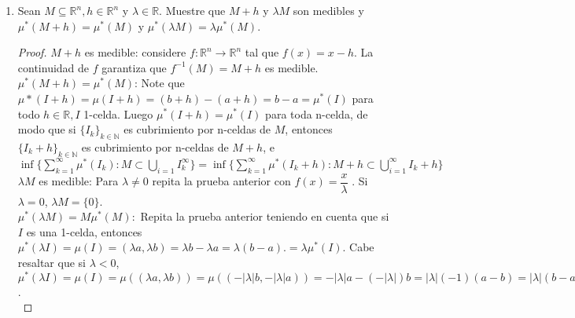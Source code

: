 \documentclass[spanish,12pt,a4paper,openany]{book}
\begin{document}
\begin{enumerate}
\begin{proof}
\begin{itemize}
					\item $\mu^{*}(\mathbb{R}-E_{k}) = 0$ para cada $k$ entonces $\mu^{*}(\mathbb{R}^{n} - \bigcup_{k \in \mathbb{N}} E_{k}) = \mu^{*}(\bigcap_{k \in \mathbb{N}} \mathbb{R}^{n} - E_{k}) \leq \mu^{*}(\mathbb{R}^{n} - E_{k}) = 0$ para cualquier $k$.				
				\end{itemize}   
				En ambos casos la unión es un elemento de $M$. Si tenemos una familia arbitraria de subconjuntos de $M$ podemos separarla en dos uniones y proceder con cada una. 
			\end{proof}
			
			\item Sean $ M \subseteq \mathbb{R}^{n}, h \in \mathbb{R} ^{n}$ y $\lambda \in \mathbb{R}$. Muestre que $M + h $ y $ \lambda M$ son medibles y $\mu^{*}(M+h) = \mu^{*}(M)$ y $\mu^{*}(\lambda M) = \lambda \mu^{*}(M)$. 
			
				\begin{proof}
					$M + h$ es medible: considere $f: \mathbb{R}^{n} \rightarrow \mathbb{R}^{n}$ tal que $f(x) = x - h$. La continuidad de $f$ garantiza que $f ^{-1} (M) = M + h$ es medible.\\
					
					$\mu^{*} (M + h) = \mu^{*} (M)$: Note que $\mu*(I + h) = \mu(I + h) = (b + h) - (a + h)  = b - a = \mu^{*}(I)$ para todo $h \in  \mathbb{R}, I $ 1-celda. Luego $\mu^{*}(I+h)  = \mu^{*}(I)$ para toda n-celda, de modo que si $\{ I_{k}\}_{k \in \mathbb{N}}$ es cubrimiento por n-celdas de $M$, entonces $\{I_{k} + h\}_{k \in \mathbb{N}}$ es cubrimiento por n-celdas de $M + h$, e $\inf \{ \sum_{k=1}^{\infty} \mu^{*} (I_{k}) : M \subset \bigcup_{i=1} I_{k}^{\infty}\} = \inf \{ \sum_{k=1}^{\infty} \mu^{*} (I_{k} + h) : M + h\subset \bigcup_{i=1}^{\infty} I_{k} + h \}$\\
					
					$\lambda M$ es medible: Para $\lambda \neq 0$ repita la prueba anterior con $f(x) = \dfrac{x}{\lambda}$ . Si $\lambda = 0$, $\lambda M = \{ 0 \}$.\\
					
					$\mu^{*}(\lambda M) = M \mu^{*} (M):$ Repita la prueba anterior teniendo en cuenta que si $I$ es una 1-celda, entonces $ \mu^{*}(\lambda I) = \mu(I) = (\lambda a , \lambda b) = \lambda b - \lambda a = \lambda(b-a). =  \lambda \mu^{*}(I)$. Cabe resaltar que si $\lambda < 0 $, $\mu^{*}(\lambda I) = \mu(I) = \mu((\lambda a , \lambda b)) = \mu((-|\lambda| b   , -|\lambda | a)) = -|\lambda| a  - (-|\lambda|) b = |\lambda|(-1)(a-b) = |\lambda|(b-a). =  |\lambda| \mu^{*}(I)$.\\
					

\end{proof}
\end{enumerate}
\end{document}
